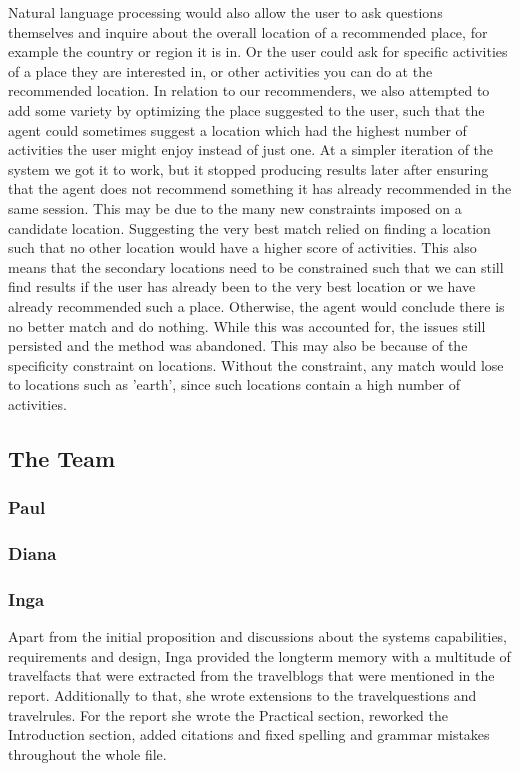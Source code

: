 \documentclass[11pt]{article} %
\begin{document}
Natural language processing would also allow the user to ask questions themselves and inquire about the overall location of a recommended place, for example the country or region it is in. Or the user could ask for specific activities of a place they are interested in, or other activities you can do at the recommended location. In relation to our recommenders, we also attempted to add some variety by optimizing the place suggested to the user, such that the agent could sometimes suggest a location which had the highest 
number of activities the user might enjoy instead of just one. At a simpler iteration of the system we got it to work, but it stopped producing results later after ensuring that the agent does not 
recommend something it has already recommended in the same session. This may be due to the many new constraints imposed on a candidate location. Suggesting the very best match relied on 
finding a location such that no other location would have a higher score of activities. This also means that the secondary locations need to be constrained such that we can still find results 
if the user has already been to the very best location or we have already recommended such a place. Otherwise, the agent would conclude there is no better match and do nothing. While this was 
accounted for, the issues still persisted and the method was abandoned. This may also be because of the specificity constraint on locations. Without the constraint, any match would lose to locations such as 'earth',
 since such locations contain a high number of activities.

 
\subsection{The Team}
\subsubsection{Paul}
\subsubsection{Diana}
\subsubsection{Inga}
Apart from the initial proposition and discussions about the systems capabilities, requirements and design, Inga provided the longterm memory with a multitude of travelfacts that were extracted from the travelblogs that were mentioned in the report. 
Additionally to that, she wrote extensions to the travelquestions and travelrules. 
For the report she wrote the Practical section, reworked the Introduction section, added citations and fixed spelling and grammar mistakes throughout the whole file.
\end{document}
